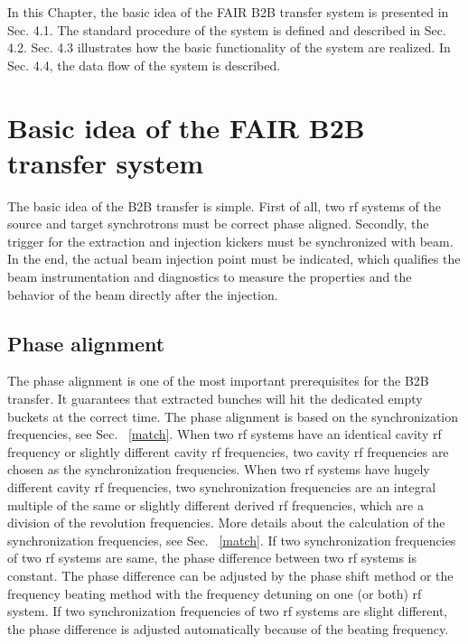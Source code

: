

In this Chapter, the basic idea of the FAIR B2B transfer system is presented in Sec. 4.1. The standard procedure of the system is defined and described in Sec. 4.2. Sec. 4.3 illustrates how the basic functionality of the system are realized. In Sec. 4.4, the data flow of the system is described. 

\section{Basic idea of the FAIR B2B transfer system} 
The basic idea of the B2B transfer is simple. First of all, two rf systems of the source and target synchrotrons must be correct phase aligned. Secondly, the trigger for the extraction and injection kickers must be synchronized with beam. In the end, the actual beam injection point must be indicated, which
qualifies the beam instrumentation and diagnostics to measure the properties and the behavior of the beam directly after the injection. 



\subsection{Phase alignment}
The phase alignment is one of the most important prerequisites for the B2B transfer. It guarantees that extracted bunches will hit the dedicated empty buckets at the correct time. The phase alignment is based on the synchronization frequencies, see Sec. ~\ref{match}. When two rf systems have an identical cavity rf frequency or slightly different cavity rf frequencies, two cavity rf frequencies are chosen as the synchronization frequencies. When two rf systems have hugely different cavity rf frequencies, two synchronization frequencies are an integral multiple of the same or slightly different derived rf frequencies, which are a division of the revolution frequencies. More details about the calculation of the synchronization frequencies, see Sec. ~\ref{match}. If two synchronization frequencies of two rf systems are same, the phase difference between two rf systems is constant. The phase difference can be adjusted by the phase shift method or the frequency beating method with the frequency detuning on one (or both) rf system. If two synchronization frequencies of two rf systems are slight different, the phase difference is adjusted automatically because of the beating frequency. %

